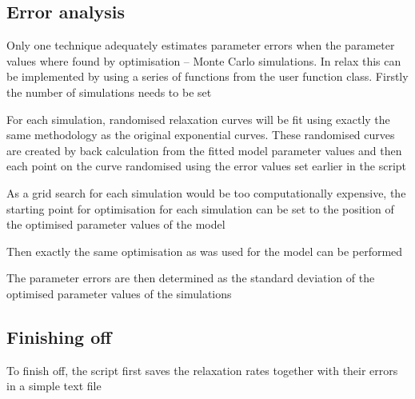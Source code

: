 



\subsection{Error analysis}

Only one technique adequately estimates parameter errors when the parameter values where found by optimisation -- Monte Carlo simulations.  In relax this can be implemented by using a series of functions from the  user function class.  Firstly the number of simulations needs to be set


For each simulation, randomised relaxation curves will be fit using exactly the same methodology as the original exponential curves.  These randomised curves are created by back calculation from the fitted model parameter values and then each point on the curve randomised using the error values set earlier in the script


As a grid search for each simulation would be too computationally expensive, the starting point for optimisation for each simulation can be set to the position of the optimised parameter values of the model


Then exactly the same optimisation as was used for the model can be performed


The parameter errors are then determined as the standard deviation of the optimised parameter values of the simulations




\subsection{Finishing off}

To finish off, the script first saves the relaxation rates together with their errors in a simple text file


